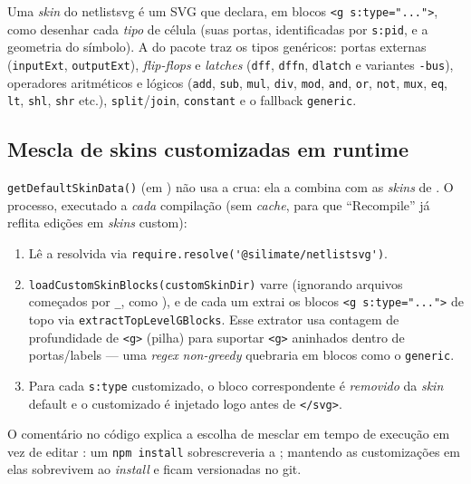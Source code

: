 Uma \emph{skin} do netlistsvg é um SVG que declara, em blocos
\lstinline|<g s:type="...">|, como desenhar cada \emph{tipo} de célula (suas
portas, identificadas por \lstinline|s:pid|, e a geometria do símbolo). A
 do pacote traz os tipos genéricos: portas externas
(\lstinline|inputExt|, \lstinline|outputExt|), \emph{flip-flops} e \emph{latches}
(\lstinline|dff|, \lstinline|dffn|, \lstinline|dlatch| e variantes \lstinline|-bus|),
operadores aritméticos e lógicos (\lstinline|add|, \lstinline|sub|, \lstinline|mul|,
\lstinline|div|, \lstinline|mod|, \lstinline|and|, \lstinline|or|, \lstinline|not|,
\lstinline|mux|, \lstinline|eq|, \lstinline|lt|, \lstinline|shl|, \lstinline|shr|
etc.), \lstinline|split|/\lstinline|join|, \lstinline|constant| e o fallback
\lstinline|generic|.

\subsection{Mescla de skins customizadas em runtime}

\lstinline|getDefaultSkinData()| (em ) não usa a
 crua: ela a combina com as \emph{skins} de
. O processo, executado a \emph{cada} compilação (sem
\emph{cache}, para que \enquote{Recompile} já reflita edições em \emph{skins}
custom):

\begin{enumerate}[leftmargin=2.2em]
  \item Lê a  resolvida via
        \lstinline|require.resolve('@silimate/netlistsvg')|.
  \item \lstinline|loadCustomSkinBlocks(customSkinDir)| varre
         (ignorando arquivos começados por
        \lstinline|_|, como ), e de cada um extrai os blocos
        \lstinline|<g s:type="...">| de topo via
        \lstinline|extractTopLevelGBlocks|. Esse extrator usa contagem de
        profundidade de \lstinline|<g>| (pilha) para suportar \lstinline|<g>|
        aninhados dentro de portas/labels --- uma \emph{regex} \emph{non-greedy}
        quebraria em blocos como o \lstinline|generic|.
  \item Para cada \lstinline|s:type| customizado, o bloco correspondente é
        \emph{removido} da \emph{skin} default e o customizado é injetado logo
        antes de \lstinline|</svg>|.
\end{enumerate}

O comentário no código explica a escolha de mesclar em tempo de execução em vez
de editar : um \lstinline|npm install|
sobrescreveria a ; mantendo as customizações em
 elas sobrevivem ao \emph{install} e ficam versionadas
no git.

